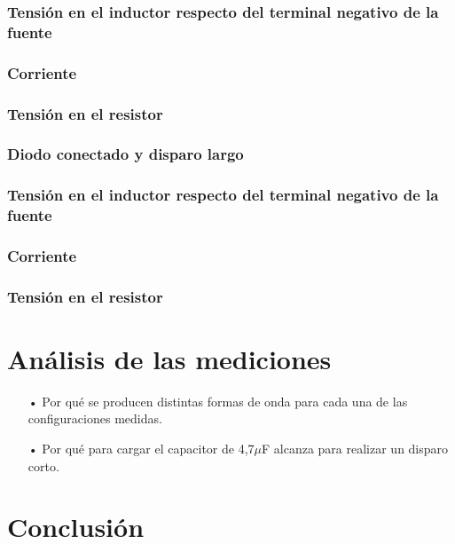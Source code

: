 \documentclass[a4paper,10pt]{article}
\begin{document}
\subsubsection*{Tensión en el inductor respecto del terminal negativo de la fuente}
\subsubsection*{Corriente}
\subsubsection*{Tensión en el resistor}

\subsubsection{Diodo conectado y disparo largo}

\subsubsection*{Tensión en el inductor respecto del terminal negativo de la fuente}
\subsubsection*{Corriente}
\subsubsection*{Tensión en el resistor}

\section{Análisis de las mediciones}

\begin{enumerate}
	\item[•] Por qué se producen distintas formas de onda para cada una de las configuraciones medidas.
	
	\item[•]	 Por qué para cargar el capacitor de 4,7$\mu$F alcanza para realizar un disparo corto.
	
\end{enumerate}

\section{Conclusión}
\end{document}
